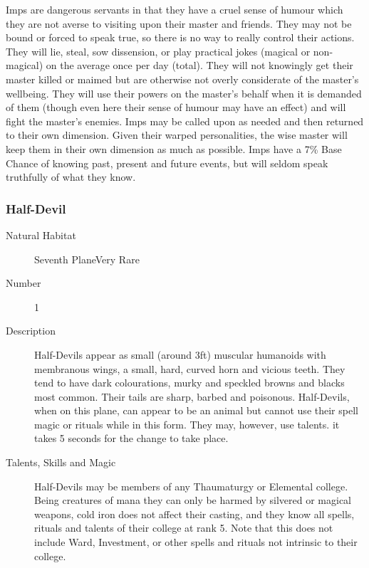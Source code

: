 \begin{multicols}{2}
\begin{description}
\setlength\itemsep{0pt}

\item[Comments]Imps are dangerous servants in that they have a cruel sense
of humour which they are not averse to visiting upon their master and
friends.  They may not be bound or forced to speak true, so there is
no way to really control their actions.  They will lie, steal, sow
dissension, or play practical jokes (magical or non-magical) on the
average once per day (total).  They will not knowingly get their
master killed or maimed but are otherwise not overly considerate of
the master's wellbeing.  They will use their powers on the master's
behalf when it is demanded of them (though even here their sense of
humour may have an effect) and will fight the master's enemies.  Imps
may be called upon as needed and then returned to their own dimension.
Given their warped personalities, the wise master will keep them in
their own dimension as much as possible.  Imps have a 7\% Base
Chance of knowing past, present and future events, but will seldom
speak truthfully of what they know.

\end{description}

\subsubsection{Half-Devil}

\begin{description}
\item[Natural Habitat]Seventh PlaneVery Rare

\item[Number] 1

\item[Description]Half-Devils appear as small (around 3ft) muscular humanoids with
membranous wings, a small, hard, curved horn and vicious teeth.  They
tend to have dark colourations, murky and speckled browns and blacks
most common.  Their tails are sharp, barbed and poisonous.
Half-Devils, when on this plane, can appear to be an animal but cannot
use their spell magic or rituals while in this form.  They may,
however, use talents.  it takes 5 seconds for the change to take
place.

\item[Talents, Skills and Magic]Half-Devils may be members of any Thaumaturgy or Elemental
college.  Being creatures of mana they can only be harmed by silvered
or magical weapons, cold iron does not affect their casting, and they
know all spells, rituals and talents of their college at rank 5.  Note
that this does not include Ward, Investment, or other spells and
rituals not intrinsic to their college.


\end{description}
\end{multicols}
